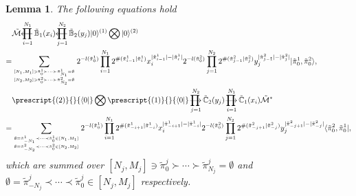 \documentclass[11pt,reqno]{amsart}
\numberwithin{equation}{section}
\newtheorem{lemma}[theorem]{Lemma}
\def\lprod{\mathop{\prod{\mkern-29.5mu}{\mathbf\longleftarrow}}}
\def\rprod{\mathop{\prod{\mkern-28.0mu}{\mathbf\longrightarrow}}}
\begin{document}
	\begin{lemma}\label{M-n-0}
		The following equations hold
		\begin{align}
			&\tilde{\mathcal{M}}
			\lprod_{i=1}^{N_1} \tilde{\mathbb{B}}_{1}(x_i)
			\lprod_{j=1}^{N_2} \tilde{\mathbb{B}}_{2}(y_j)
			|0\rangle^{(1)}\bigotimes|0\rangle^{(2)}\notag\\
			=& \sum_{{ [N_{1},M_{1}] \ni \tilde{\pi}^{1}_0 \succ \cdots \succ \tilde{\pi}^{1}_{N_{1}} = \emptyset}
				\atop{[N_{2},M_{2}] \ni \tilde{\pi}^{2}_0 \succ \cdots \succ \tilde{\pi}^{2}_{N_{2}} = \emptyset}}
			2^{-l(\tilde{\pi}^{1}_{0})}
			\prod_{i=1}^{N_1}
			2^{\#(\tilde{\pi}^{1}_{i-1}|\tilde{\pi}^{1}_{i}) }		
			x_i^{|\tilde{\pi}^{1}_{i-1}| - |\tilde{\pi}^{1}_i|}
			2^{-l(\tilde{\pi}^{2}_{0})}	
			\prod_{j=1}^{N_2}
			2^{\#(\tilde{\pi}^{2}_{j-1}|\tilde{\pi}^{2}_{j}) }		
			y_j^{|\tilde{\pi}^{2}_{j-1}| - |\tilde{\pi}^{2}_j|}
			| \tilde{\pi}^{1}_0,\tilde{\pi}^{2}_0 \rangle,
			\label{M-B1-BN-x}\\
			&\prescript{(2)}{}{\langle 0|}\bigotimes \prescript{(1)}{}{\langle 0|}
			\rprod_{j=1}^{N_2} \tilde{\mathbb{C}}_{2}(y_j)
			\rprod_{i=1}^{N_1} \tilde{\mathbb{C}}_{1}(x_i) \tilde{\mathcal{M}}^* \notag\\
			=&
			\sum_{{ \emptyset=\tilde{\pi}^{1}_{-N_{1}} \prec \cdots \prec \tilde{\pi}^{1}_0  \in [N_{1}, M_{1}]}
				\atop{\emptyset=\tilde{\pi}^{2}_{-N_{2}} \prec \cdots \prec \tilde{\pi}^{2}_0  \in [N_{2}, M_{2}]}} 		
			2^{-l(\tilde{\pi}^{1}_{0})}
			\prod_{i=1}^{N_1}
			2^{\#(\tilde{\pi}^{1}_{-i+1}|\tilde{\pi}^{1}_{-i}) }		
			x_i^{|\tilde{\pi}^{1}_{-i+1}| - |\tilde{\pi}^{1}_{-i}|}
			2^{-l(\tilde{\pi}^{2}_{0})}	
			\prod_{j=1}^{N_2}
			2^{\#(\tilde{\pi}^{2}_{-j+1}|\tilde{\pi}^{2}_{-j}) }		
			y_j^{|\tilde{\pi}^{2}_{-j+1}| - |\tilde{\pi}^{2}_{-j}|}
			\langle \tilde{\pi}^{2}_0,\tilde{\pi}^{1}_0|,\label{M-C1-CN-x}
		\end{align}	
		which are summed over $[N_{j},M_{j}] \ni \tilde{\pi}^{j}_0 \succ \cdots \succ \tilde{\pi}^{j}_{N_{j}} = \emptyset$ and $\emptyset=\tilde{\pi}^{j}_{-N_{j}} \prec \cdots \prec\tilde{\pi}^{j}_0  \in [N_{j}, M_{j}]$ respectively.
	\end{lemma}
\end{document}
